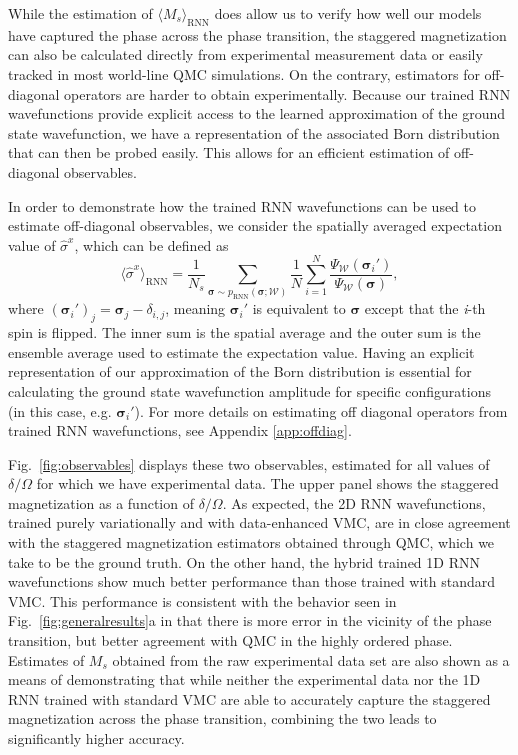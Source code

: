 \documentclass[twocolumn,
                showpacs,
                nofootinbib,
                nobibnotes,
                aps,
                superscriptaddress,
                amssymb,
                amsmath,
                floatfix,
                reprint,
                prx, 
                notitlepage,
                showkeys,
                10pt,
		]{revtex4-2}
\begin{document}
While the estimation of $\langle M_s \rangle_{\text{RNN}}$ does allow us to verify how well our models have captured the phase across the phase transition, the staggered magnetization can also be calculated directly from experimental measurement data or easily tracked in most world-line QMC simulations.
On the contrary, estimators for off-diagonal operators are harder to obtain experimentally.
Because our trained RNN wavefunctions provide explicit access to the learned approximation of the ground state wavefunction, we have a representation of the associated Born distribution that can then be probed easily. This allows for an efficient estimation of off-diagonal observables. 

In order to demonstrate how the trained RNN wavefunctions can be used to estimate off-diagonal observables, we consider the spatially averaged expectation value of $\hat\sigma^x$, which can be defined as
\begin{equation}
    \langle\hat{\sigma}^x\rangle_{\text{RNN}} = \frac{1}{N_s}\sum_{\boldsymbol\sigma\sim p_{\text{RNN}}(\boldsymbol\sigma;\mathcal{W})}  \frac{1}{N}\sum_{i=1}^{N} \frac{ \Psi_{\mathcal{W}}(\boldsymbol\sigma_i\prime)}{\Psi_{\mathcal{W}}(\boldsymbol\sigma)},
\label{expectation_sigmax}
\end{equation}
where $ (\boldsymbol\sigma_i\prime)_j = \boldsymbol\sigma_j - \delta_{i,j}$, meaning $\boldsymbol\sigma_i\prime$ is equivalent to $\boldsymbol\sigma$ except that the {\it i}-th spin is flipped. The inner sum is the spatial average and the outer sum is the ensemble average used to estimate the expectation value. Having an explicit representation of our approximation of the Born distribution is essential for calculating the ground state wavefunction amplitude for specific configurations (in this case, e.g. $\boldsymbol\sigma_i\prime$). For more details on estimating off diagonal operators from trained RNN wavefunctions, see Appendix \ref{app:offdiag}.



Fig.~\ref{fig:observables} displays these two observables, estimated for all values of $\delta/\Omega$ for which we have experimental data.
The upper panel shows the staggered magnetization as a function of $\delta/\Omega$. As expected, the 2D RNN wavefunctions, trained purely variationally and with data-enhanced VMC, are in close agreement with the staggered magnetization estimators obtained through QMC, which we take to be the ground truth. 
On the other hand, 
the hybrid trained 1D RNN wavefunctions show much better performance than those trained with standard VMC. This performance is consistent with the behavior seen in Fig.~\ref{fig:generalresults}a in that there is more error in the vicinity of the phase transition, but better agreement with QMC in the highly ordered phase. Estimates of $M_s$ obtained from the raw experimental data set are also shown as a means of demonstrating that while neither the experimental data nor the 1D RNN trained with standard VMC are able to accurately capture the staggered magnetization across the phase transition, combining the two leads to significantly higher accuracy.
\end{document}
